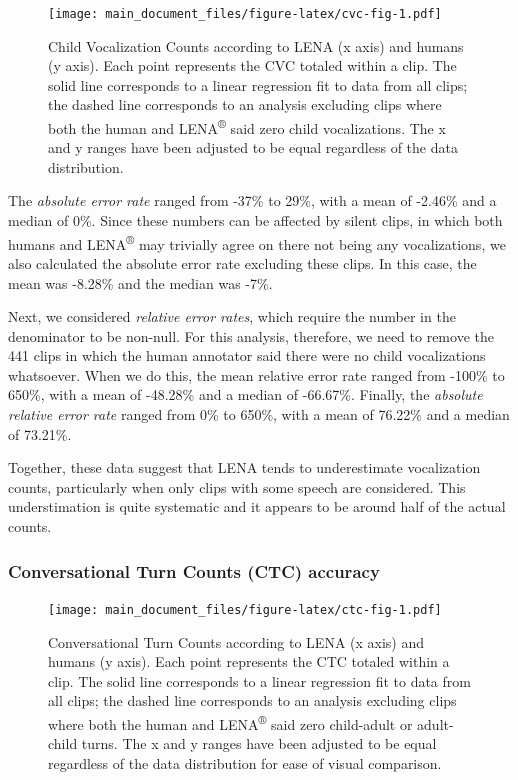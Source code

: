 \documentclass[english,table,man,floatsintext]{apa6}
\begin{document}
\begin{figure}
\centering
\texttt{[image: main\_document\_files/figure-latex/cvc-fig-1.pdf]}
\caption{\label{fig:cvc-fig}Child Vocalization Counts according to LENA (x axis) and humans (y axis). Each point represents the CVC totaled within a clip. The solid line corresponds to a linear regression fit to data from all clips; the dashed line corresponds to an analysis excluding clips where both the human and LENA\textsuperscript{®} said zero child vocalizations. The x and y ranges have been adjusted to be equal regardless of the data distribution.}
\end{figure}

The \emph{absolute error rate} ranged from -37\% to 29\%, with a mean of -2.46\% and a median of 0\%. Since these numbers can be affected by silent clips, in which both humans and LENA\textsuperscript{®} may trivially agree on there not being any vocalizations, we also calculated the absolute error rate excluding these clips. In this case,
the mean was -8.28\% and the median was -7\%.

Next, we considered \emph{relative error rates}, which require the number in the denominator to be non-null. For this analysis, therefore, we need to remove the 441 clips in which the human annotator said there were no child vocalizations whatsoever. When we do this, the mean relative error rate ranged from -100\% to 650\%, with a mean of -48.28\% and a median of -66.67\%. Finally, the \emph{absolute relative error rate} ranged from 0\% to 650\%, with a mean of 76.22\% and a median of 73.21\%.

Together, these data suggest that LENA tends to underestimate vocalization counts, particularly when only clips with some speech are considered. This understimation is quite systematic and it appears to be around half of the actual counts.

\hypertarget{conversational-turn-counts-ctc-accuracy}{%
\subsubsection{Conversational Turn Counts (CTC) accuracy}\label{conversational-turn-counts-ctc-accuracy}}

\begin{figure}
\centering
\texttt{[image: main\_document\_files/figure-latex/ctc-fig-1.pdf]}
\caption{\label{fig:ctc-fig}Conversational Turn Counts according to LENA (x axis) and humans (y axis). Each point represents the CTC totaled within a clip. The solid line corresponds to a linear regression fit to data from all clips; the dashed line corresponds to an analysis excluding clips where both the human and LENA\textsuperscript{®} said zero child-adult or adult-child turns. The x and y ranges have been adjusted to be equal regardless of the data distribution for ease of visual comparison.}
\end{figure}
\end{document}
